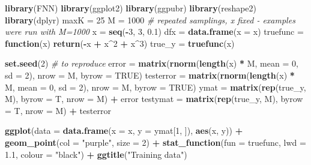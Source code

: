\documentclass[]{article}
\newenvironment{Shaded}{\begin{snugshade}}{\end{snugshade}}
\newcommand{\KeywordTok}[1]{\textcolor[rgb]{0.13,0.29,0.53}{\textbf{#1}}}
\newcommand{\DataTypeTok}[1]{\textcolor[rgb]{0.13,0.29,0.53}{#1}}
\newcommand{\DecValTok}[1]{\textcolor[rgb]{0.00,0.00,0.81}{#1}}
\newcommand{\FloatTok}[1]{\textcolor[rgb]{0.00,0.00,0.81}{#1}}
\newcommand{\StringTok}[1]{\textcolor[rgb]{0.31,0.60,0.02}{#1}}
\newcommand{\CommentTok}[1]{\textcolor[rgb]{0.56,0.35,0.01}{\textit{#1}}}
\newcommand{\OtherTok}[1]{\textcolor[rgb]{0.56,0.35,0.01}{#1}}
\newcommand{\ControlFlowTok}[1]{\textcolor[rgb]{0.13,0.29,0.53}{\textbf{#1}}}
\newcommand{\OperatorTok}[1]{\textcolor[rgb]{0.81,0.36,0.00}{\textbf{#1}}}
\newcommand{\NormalTok}[1]{#1}
\begin{document}
\begin{Shaded}
\begin{Highlighting}[]
\KeywordTok{library}\NormalTok{(FNN)}
\KeywordTok{library}\NormalTok{(ggplot2)}
\KeywordTok{library}\NormalTok{(ggpubr)}
\KeywordTok{library}\NormalTok{(reshape2)}
\KeywordTok{library}\NormalTok{(dplyr)}
\NormalTok{maxK =}\StringTok{ }\DecValTok{25}
\NormalTok{M =}\StringTok{ }\DecValTok{1000}  \CommentTok{# repeated samplings, x fixed  - examples were run with M=1000}
\NormalTok{x =}\StringTok{ }\KeywordTok{seq}\NormalTok{(}\OperatorTok{-}\DecValTok{3}\NormalTok{, }\DecValTok{3}\NormalTok{, }\FloatTok{0.1}\NormalTok{)}
\NormalTok{dfx =}\StringTok{ }\KeywordTok{data.frame}\NormalTok{(}\DataTypeTok{x =}\NormalTok{ x)}
\NormalTok{truefunc =}\StringTok{ }\ControlFlowTok{function}\NormalTok{(x) }\KeywordTok{return}\NormalTok{(}\OperatorTok{-}\NormalTok{x }\OperatorTok{+}\StringTok{ }\NormalTok{x}\OperatorTok{^}\DecValTok{2} \OperatorTok{+}\StringTok{ }\NormalTok{x}\OperatorTok{^}\DecValTok{3}\NormalTok{)}
\NormalTok{true_y =}\StringTok{ }\KeywordTok{truefunc}\NormalTok{(x)}

\KeywordTok{set.seed}\NormalTok{(}\DecValTok{2}\NormalTok{)  }\CommentTok{# to reproduce}
\NormalTok{error =}\StringTok{ }\KeywordTok{matrix}\NormalTok{(}\KeywordTok{rnorm}\NormalTok{(}\KeywordTok{length}\NormalTok{(x) }\OperatorTok{*}\StringTok{ }\NormalTok{M, }\DataTypeTok{mean =} \DecValTok{0}\NormalTok{, }\DataTypeTok{sd =} \DecValTok{2}\NormalTok{), }\DataTypeTok{nrow =}\NormalTok{ M, }\DataTypeTok{byrow =} \OtherTok{TRUE}\NormalTok{)}
\NormalTok{testerror =}\StringTok{ }\KeywordTok{matrix}\NormalTok{(}\KeywordTok{rnorm}\NormalTok{(}\KeywordTok{length}\NormalTok{(x) }\OperatorTok{*}\StringTok{ }\NormalTok{M, }\DataTypeTok{mean =} \DecValTok{0}\NormalTok{, }\DataTypeTok{sd =} \DecValTok{2}\NormalTok{), }\DataTypeTok{nrow =}\NormalTok{ M, }
    \DataTypeTok{byrow =} \OtherTok{TRUE}\NormalTok{)}
\NormalTok{ymat =}\StringTok{ }\KeywordTok{matrix}\NormalTok{(}\KeywordTok{rep}\NormalTok{(true_y, M), }\DataTypeTok{byrow =}\NormalTok{ T, }\DataTypeTok{nrow =}\NormalTok{ M) }\OperatorTok{+}\StringTok{ }\NormalTok{error}
\NormalTok{testymat =}\StringTok{ }\KeywordTok{matrix}\NormalTok{(}\KeywordTok{rep}\NormalTok{(true_y, M), }\DataTypeTok{byrow =}\NormalTok{ T, }\DataTypeTok{nrow =}\NormalTok{ M) }\OperatorTok{+}\StringTok{ }\NormalTok{testerror}

\KeywordTok{ggplot}\NormalTok{(}\DataTypeTok{data =} \KeywordTok{data.frame}\NormalTok{(}\DataTypeTok{x =}\NormalTok{ x, }\DataTypeTok{y =}\NormalTok{ ymat[}\DecValTok{1}\NormalTok{, ]), }\KeywordTok{aes}\NormalTok{(x, y)) }\OperatorTok{+}\StringTok{ }\KeywordTok{geom_point}\NormalTok{(}\DataTypeTok{col =} \StringTok{"purple"}\NormalTok{, }
    \DataTypeTok{size =} \DecValTok{2}\NormalTok{) }\OperatorTok{+}\StringTok{ }\KeywordTok{stat_function}\NormalTok{(}\DataTypeTok{fun =}\NormalTok{ truefunc, }\DataTypeTok{lwd =} \FloatTok{1.1}\NormalTok{, }\DataTypeTok{colour =} \StringTok{"black"}\NormalTok{) }\OperatorTok{+}\StringTok{ }
\StringTok{    }\KeywordTok{ggtitle}\NormalTok{(}\StringTok{"Training data"}\NormalTok{)}


\end{Highlighting}
\end{Shaded}
\end{document}
